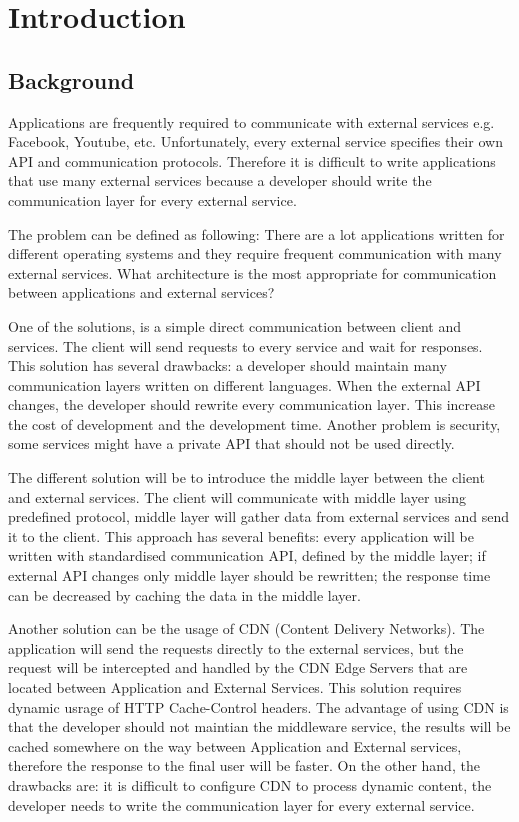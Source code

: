 \section*{Introduction}

\subsection{Background}

Applications are frequently required to communicate with external services e.g. Facebook, Youtube, etc. Unfortunately, every external service specifies their own API and communication protocols. Therefore it is difficult to write applications that use many external services because a developer should write the communication layer for every external service. 

The problem can be defined as following:  There are a lot applications written for different operating systems and they require frequent communication with many external services. What architecture is the most appropriate for communication between applications and external services? 

One of the solutions, is a simple direct communication between client and services. The client will send requests to every service and wait for responses. This solution has several drawbacks: a developer should maintain many communication layers written on different languages. When the external API changes, the developer should rewrite every communication layer. This increase the cost of development and the development time. Another problem is security, some services might have a private API that should not be used directly.

The different solution will be to introduce the middle layer between the client and external services. The client will communicate with middle layer using predefined protocol, middle layer will gather data from external services and send it to the client. This approach has several benefits: every application will be written with standardised communication API, defined by the middle layer; if external API changes only middle layer should be rewritten; the response time can be decreased by caching the data in the middle layer. 

Another solution can be the usage of CDN (Content Delivery Networks). The application will send the requests directly to the external services, but the request will be intercepted and handled by the CDN Edge Servers that are located between Application and External Services. This solution requires dynamic usrage of HTTP Cache-Control headers. The advantage of using CDN is that the developer should not maintian the middleware service, the results will be cached somewhere on the way between Application and External services, therefore the response to the final user will be faster. On the other hand, the drawbacks are: it is difficult to configure CDN to process dynamic content, the developer needs to write the communication layer for every external service. 

